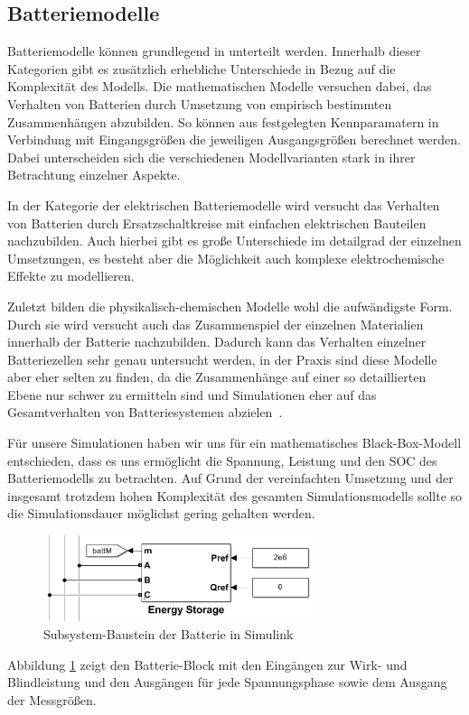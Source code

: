 \subsection{Batteriemodelle}\label{Batteriemodelle}
Batteriemodelle können grundlegend in 
unterteilt werden. 
Innerhalb dieser Kategorien gibt es zusätzlich erhebliche Unterschiede in Bezug auf die Komplexität des Modells.
Die mathematischen Modelle versuchen dabei, das Verhalten von Batterien durch Umsetzung von empirisch bestimmten
Zusammenhängen abzubilden.
So können aus festgelegten Kennparamatern in Verbindung mit Eingangsgrößen die jeweiligen Ausgangsgrößen berechnet werden.
Dabei unterscheiden sich die verschiedenen Modellvarianten stark in ihrer Betrachtung einzelner Aspekte.

In der Kategorie der elektrischen Batteriemodelle wird versucht das Verhalten von Batterien durch Ersatzschaltkreise
mit einfachen elektrischen Bauteilen nachzubilden.
Auch hierbei gibt es große Unterschiede im detailgrad der einzelnen Umsetzungen, es besteht aber die Möglichkeit
auch komplexe elektrochemische Effekte zu modellieren.

Zuletzt bilden die physikalisch-chemischen Modelle wohl die aufwändigste Form.
Durch sie wird versucht auch das Zusammenspiel der einzelnen Materialien innerhalb der Batterie nachzubilden.
Dadurch kann das Verhalten einzelner Batteriezellen sehr genau untersucht werden, in der Praxis sind diese
Modelle aber eher selten zu finden, da die Zusammenhänge auf einer so detaillierten Ebene nur schwer zu ermitteln sind
und Simulationen eher auf das Gesamtverhalten von Batteriesystemen abzielen~\parencite[]{keil2012aufbau}.

Für unsere Simulationen haben wir uns für ein mathematisches Black-Box-Modell entschieden, dass es uns ermöglicht
die Spannung, Leistung und den SOC des Batteriemodells zu betrachten.
Auf Grund der vereinfachten Umsetzung und der insgesamt trotzdem hohen Komplexität des gesamten Simulationsmodells
sollte so die Simulationsdauer möglichst gering gehalten werden.

\begin{figure}[h!]
    \centering
    \includegraphics[width=8cm]{Abbildungen/BatterieBlackBox.png}
    \caption{Subsystem-Baustein der Batterie in Simulink}\label{BatModell}
\end{figure}
Abbildung \ref{BatModell} zeigt den Batterie-Block mit den Eingängen zur Wirk- und Blindleistung und den 
Ausgängen für jede Spannungsphase sowie dem Ausgang der Messgrößen.

